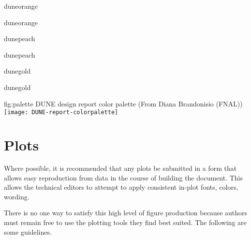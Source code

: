 \begin{minipage}[t]{0.3\linewidth}
  \begin{tcolorbox}[colback=duneorange]
    duneorange    
  \end{tcolorbox}
  \begin{tcolorbox}[colback=white,colframe=duneorange]
    duneorange    
  \end{tcolorbox}
\end{minipage}
\begin{minipage}[t]{0.3\linewidth}
  \begin{tcolorbox}[colback=dunepeach]
    dunepeach    
  \end{tcolorbox}
  \begin{tcolorbox}[colback=white,colframe=dunepeach]
    dunepeach    
  \end{tcolorbox}
\end{minipage}
\begin{minipage}[t]{0.3\linewidth}
  \begin{tcolorbox}[colback=dunegold]
    dunegold    
  \end{tcolorbox}
  \begin{tcolorbox}[colback=white,colframe=dunegold]
    dunegold    
  \end{tcolorbox}
\end{minipage}



\begin{dunefigure}{fig:palette}
  {DUNE design report color palette (From Diana Brandonisio (FNAL))}
  \texttt{[image: DUNE-report-colorpalette]}
\end{dunefigure}

\section{Plots}
\label{sec:graphic-plots}

Where possible, it is recommended that any plots be submitted in a
form that allows easy reproduction from data in the course of building
the document.
This allows the technical editors to attempt to apply consistent
in-plot fonts, colors, wording.

There is no one way to satisfy this high level of figure production
because authors must remain free to use the plotting tools they find
best suited.  The following are some guidelines.


